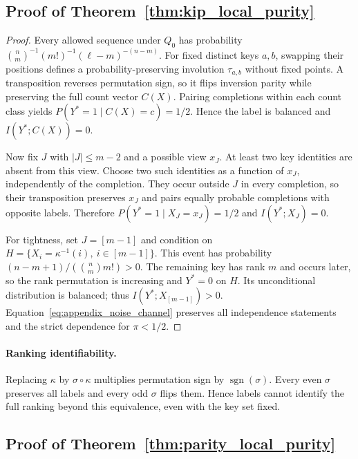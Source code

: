 \documentclass{article} %
\theoremstyle{plain}
\theoremstyle{definition}
\theoremstyle{remark}
\begin{document}
\subsection{Proof of Theorem~\ref{thm:kip_local_purity}}
\label{appendix:proof_kip_local_purity}

\begin{proof}
Every allowed sequence under $Q_0$ has probability
$\binom nm^{-1}(m!)^{-1}(\ell-m)^{-(n-m)}$.
For fixed distinct keys $a,b$, swapping their positions defines a
probability-preserving involution $\tau_{a,b}$ without fixed points.
A transposition reverses permutation sign, so it flips inversion parity
while preserving the full count vector $C(X)$. Pairing completions within
each count class yields
$P(Y^*=1\mid C(X)=c)=1/2$. Hence the label is balanced and
$I(Y^*;C(X))=0$.

Now fix $J$ with $|J|\leq m-2$ and a possible view $x_J$. At least two
key identities are absent from this view. Choose two such identities as a
function of $x_J$, independently of the completion. They occur outside
$J$ in every completion, so their transposition preserves $x_J$ and pairs
equally probable completions with opposite labels. Therefore
$P(Y^*=1\mid X_J=x_J)=1/2$ and $I(Y^*;X_J)=0$.

For tightness, set $J=[m-1]$ and condition on
$H=\{X_i=\kappa^{-1}(i),\ i\in[m-1]\}$.
This event has probability $(n-m+1)/(\binom nm m!)>0$.
The remaining key has rank $m$ and occurs later, so the rank permutation
is increasing and $Y^*=0$ on $H$. Its unconditional distribution is
balanced; thus $I(Y^*;X_{[m-1]})>0$.
Equation~\eqref{eq:appendix_noise_channel} preserves all independence
statements and the strict dependence for $\pi<1/2$.
\end{proof}

\paragraph{Ranking identifiability.}
Replacing $\kappa$ by $\sigma\circ\kappa$ multiplies permutation sign by
$\operatorname{sgn}(\sigma)$. Every even $\sigma$ preserves all labels
and every odd $\sigma$ flips them. Hence labels cannot identify the full
ranking beyond this equivalence, even with the key set fixed.

\subsection{Proof of Theorem~\ref{thm:parity_local_purity}}
\label{appendix:proof_parity_local_purity}
\end{document}
